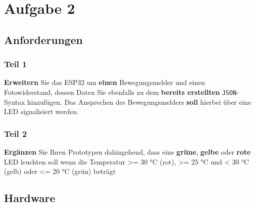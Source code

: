 \documentclass[9pt,a4paper]{report}
\begin{document}
	\chapter{Aufgabe 2}
	\section{Anforderungen}
	\subsection{Teil 1}
	\textbf{Erweitern} Sie das ESP32 um \textbf{einen} Bewegungsmelder und einen 
	Fotowiderstand, dessen Daten Sie ebenfalls zu dem \textbf{bereits erstellten} \texttt{JSON}-Syntax hinzufügen. Das Ansprechen des Bewegungsmelders \textbf{soll} hierbei über 
	eine LED signalisiert werden.
	
	\subsection{Teil 2}
	\textbf{Ergänzen} Sie Ihren Prototypen dahingehend, dass eine \textbf{grüne}, \textbf{gelbe} oder \textbf{rote}
	LED leuchten soll wenn die Temperatur >= 30 °C (rot), >= 25 °C und < 30 °C
	(gelb) oder <= 20 °C (grün) beträgt
	
	
	\section{Hardware}
\end{document}
